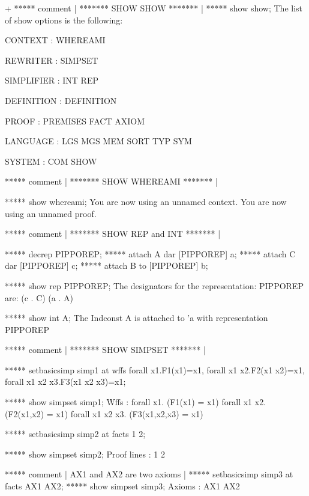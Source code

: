 



\gfexample+
   ***** comment | ******* SHOW SHOW ******* |
   ***** show show;
   The list of show options is the following:

   CONTEXT : WHEREAMI 

   REWRITER : SIMPSET 

   SIMPLIFIER : INT REP 

   DEFINITION : DEFINITION 

   PROOF : PREMISES FACT AXIOM 

   LANGUAGE : LGS MGS MEM SORT TYP SYM 

   SYSTEM : COM SHOW 
   
   ***** comment | ******* SHOW WHEREAMI ******* |
   
   ***** show whereami;
   You are now using an unnamed context.
   You are now using an unnamed proof.
   
   ***** comment | ******* SHOW REP and INT ******* |
   
   ***** decrep PIPPOREP;
   ***** attach A dar [PIPPOREP] a;
   ***** attach C dar [PIPPOREP] c;
   ***** attach B to  [PIPPOREP] b;
   
   ***** show rep PIPPOREP;
   The designators for the representation: PIPPOREP are:
   (c . C) (a . A)
   
   ***** show int A;
   The Indconst A is attached to 'a
   with representation PIPPOREP
   
   ***** comment | ******* SHOW SIMPSET ******* |
   
   ***** setbasicsimp simp1 at wffs
   {forall x1.F1(x1)=x1,
   forall x1 x2.F2(x1 x2)=x1,
   forall x1 x2 x3.F3(x1 x2 x3)=x1};
   
   ***** show simpset simp1;
   Wffs :
   forall x1. (F1(x1) = x1)
   forall x1 x2. (F2(x1,x2) = x1)
   forall x1 x2 x3. (F3(x1,x2,x3) = x1)
   
   ***** setbasicsimp simp2 at facts {1 2};
   
   ***** show simpset simp2;
   Proof lines :  1 2
   
   ***** comment | AX1 and AX2 are two axioms |
   ***** setbasicsimp simp3 at facts {AX1 AX2};
   ***** show simpset simp3;
   Axioms :  AX1 AX2
   
